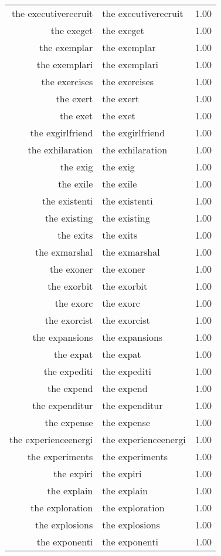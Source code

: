 \begin{table}[ht]
\begin{tabular}{rlr}
  the executiverecruit & the executiverecruit & 1.00 \\ 
  the exeget & the exeget & 1.00 \\ 
  the exemplar & the exemplar & 1.00 \\ 
  the exemplari & the exemplari & 1.00 \\ 
  the exercises & the exercises & 1.00 \\ 
  the exert & the exert & 1.00 \\ 
  the exet & the exet & 1.00 \\ 
  the exgirlfriend & the exgirlfriend & 1.00 \\ 
  the exhilaration & the exhilaration & 1.00 \\ 
  the exig & the exig & 1.00 \\ 
  the exile & the exile & 1.00 \\ 
  the existenti & the existenti & 1.00 \\ 
  the existing & the existing & 1.00 \\ 
  the exits & the exits & 1.00 \\ 
  the exmarshal & the exmarshal & 1.00 \\ 
  the exoner & the exoner & 1.00 \\ 
  the exorbit & the exorbit & 1.00 \\ 
  the exorc & the exorc & 1.00 \\ 
  the exorcist & the exorcist & 1.00 \\ 
  the expansions & the expansions & 1.00 \\ 
  the expat & the expat & 1.00 \\ 
  the expediti & the expediti & 1.00 \\ 
  the expend & the expend & 1.00 \\ 
  the expenditur & the expenditur & 1.00 \\ 
  the expense & the expense & 1.00 \\ 
  the experienceenergi & the experienceenergi & 1.00 \\ 
  the experiments & the experiments & 1.00 \\ 
  the expiri & the expiri & 1.00 \\ 
  the explain & the explain & 1.00 \\ 
  the exploration & the exploration & 1.00 \\ 
  the explosions & the explosions & 1.00 \\ 
  the exponenti & the exponenti & 1.00 \\ 

\end{tabular}
\end{table}
